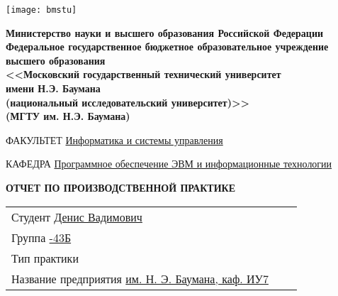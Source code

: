 \begin{titlepage}
    \thispagestyle{empty}

    \noindent\begin{minipage}{0.05\textwidth}
        \texttt{[image: bmstu]}
    \end{minipage}
    \hfill
    \begin{minipage}{0.85\textwidth}\raggedleft
        \begin{center}
            \fontsize{12pt}{0.3\baselineskip}\selectfont \textbf{Министерство науки и высшего образования Российской Федерации \\ Федеральное государственное бюджетное образовательное учреждение \\ высшего образования \\ <<Московский государственный технический университет \\ имени Н.Э. Баумана \\ (национальный исследовательский университет)>> \\ (МГТУ им. Н.Э. Баумана)}
        \end{center}
    \end{minipage}

    \begin{center}
        \fontsize{12pt}{0.1\baselineskip}\selectfont
        \noindent\makebox[\linewidth]{\rule{\textwidth}{4pt}} \makebox[\linewidth]{\rule{\textwidth}{1pt}}
    \end{center}

    \begin{flushleft}
        \fontsize{12pt}{0.8\baselineskip}\selectfont

        ФАКУЛЬТЕТ \uline{
            \hfill
            Информатика и системы управления
            \hfill}

        КАФЕДРА \uline{\mbox{\hspace{4mm}}
            \hfill
            Программное обеспечение ЭВМ и информационные технологии
            \hfill}
    \end{flushleft}

    \vfill
    
    \begin{center}
        \fontsize{19pt}{\baselineskip}\selectfont

        \textbf{ОТЧЕТ ПО ПРОИЗВОДСТВЕННОЙ ПРАКТИКЕ}
    \end{center}

    \vfill
    
    \begin{tabularx}{\textwidth}{Xcc}
        Студент \uline{ Денис Вадимович\hfill} \\
        Группа \uline{7-43Б\hfill} \\
        Тип практики \uline{\hfill} \\
        Название предприятия \uline{ им. Н. Э. Баумана, каф. ИУ7\hfill} \\
    \end{tabularx}
    

\end{titlepage}
